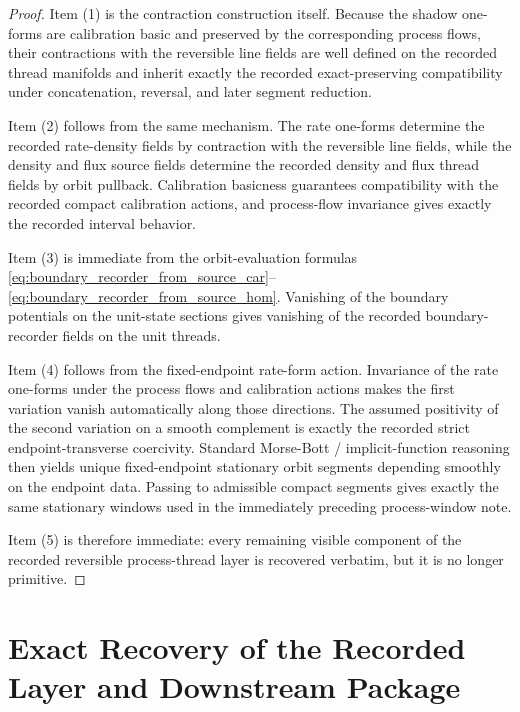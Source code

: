 \documentclass[11pt]{article}
\begin{document}
\begin{proof}
Item (1) is the contraction construction itself. Because the shadow one-forms are calibration basic and preserved by the corresponding process flows, their contractions with the reversible line fields are well defined on the recorded thread manifolds and inherit exactly the recorded exact-preserving compatibility under concatenation, reversal, and later segment reduction.

Item (2) follows from the same mechanism. The rate one-forms determine the recorded rate-density fields by contraction with the reversible line fields, while the density and flux source fields determine the recorded density and flux thread fields by orbit pullback. Calibration basicness guarantees compatibility with the recorded compact calibration actions, and process-flow invariance gives exactly the recorded interval behavior.

Item (3) is immediate from the orbit-evaluation formulas \eqref{eq:boundary_recorder_from_source_car}--\eqref{eq:boundary_recorder_from_source_hom}. Vanishing of the boundary potentials on the unit-state sections gives vanishing of the recorded boundary-recorder fields on the unit threads.

Item (4) follows from the fixed-endpoint rate-form action. Invariance of the rate one-forms under the process flows and calibration actions makes the first variation vanish automatically along those directions. The assumed positivity of the second variation on a smooth complement is exactly the recorded strict endpoint-transverse coercivity. Standard Morse-Bott / implicit-function reasoning then yields unique fixed-endpoint stationary orbit segments depending smoothly on the endpoint data. Passing to admissible compact segments gives exactly the same stationary windows used in the immediately preceding process-window note.

Item (5) is therefore immediate: every remaining visible component of the recorded reversible process-thread layer is recovered verbatim, but it is no longer primitive.
\end{proof}

\section{Exact Recovery of the Recorded Layer and Downstream Package}
\end{document}
